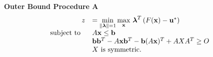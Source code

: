 \bigskip
\bigskip
\textbf{Outer Bound Procedure A}
\begin{equation}\label{eq:OPTfeasOutRelaxa}
\begin{array}{rl}
 \ z &=\min\limits_{\lVert\boldsymbol{\lambda}\rVert=1}\max\limits_{\mathbf{x}} \, \boldsymbol{\lambda}^T\left(F(\mathbf{x})-\mathbf{u}^* \right) \\
 \text{subject to } \ & A\mathbf{x}\leq \mathbf{b} \\
 	&\mathbf{b}\mathbf{b}^T-A\mathbf{x}\mathbf{b}^T-\mathbf{b}(A\mathbf{x})^T+AXA^T\geq O \\
 	&X \text{ is symmetric.}
\end{array}
\end{equation}

\bigskip





